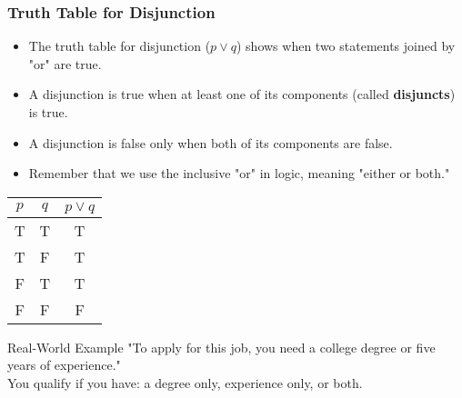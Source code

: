 \documentclass{beamer}
\begin{document}
                    \begin{frame}
                    \frametitle{Truth Table for Disjunction}
                    \begin{itemize}
                        \item The truth table for disjunction ($p \vee q$) shows when two statements joined by "or" are true.
                        \item A disjunction is true when at least one of its components (called \textbf{disjuncts}) is true.
                        \item A disjunction is false only when both of its components are false.
                        \item Remember that we use the inclusive "or" in logic, meaning "either or both."
                    \end{itemize}
                    
                    \begin{center}
                        \scriptsize
                    \begin{tabular}{|c|c|c|}
                    \hline
                    $p$ & $q$ & $p \vee q$ \\
                    \hline
                    T & T & T \\
                    \hline
                    T & F & T \\
                    \hline
                    F & T & T \\
                    \hline
                    F & F & F \\
                    \hline
                    \end{tabular}
                    \end{center}
                    
                    \begin{block}{Real-World Example}
                    "To apply for this job, you need a college degree or five years of experience."\\
                    You qualify if you have: a degree only, experience only, or both.
                    \end{block}
                    \end{frame}
                    
\end{document}
